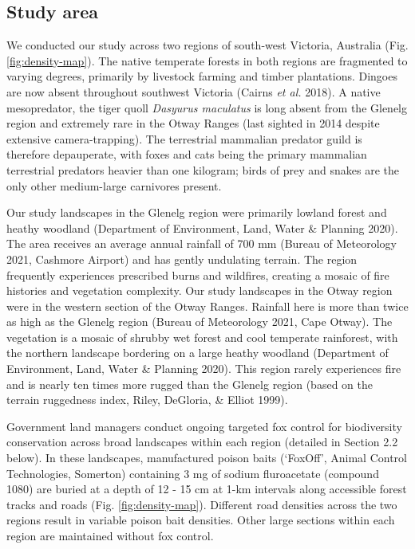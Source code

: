 \documentclass[preprint, 3p, authoryear]{elsarticle} %
\begin{document}
\hypertarget{study-area}{%
\subsection{Study area}\label{study-area}}

We conducted our study across two regions of south-west Victoria, Australia (Fig. \ref{fig:density-map}). The native temperate forests in both regions are fragmented to varying degrees, primarily by livestock farming and timber plantations. Dingoes are now absent throughout southwest Victoria (Cairns \emph{et al.} 2018). A native mesopredator, the tiger quoll \emph{Dasyurus maculatus} is long absent from the Glenelg region and extremely rare in the Otway Ranges (last sighted in 2014 despite extensive camera-trapping). The terrestrial mammalian predator guild is therefore depauperate, with foxes and cats being the primary mammalian terrestrial predators heavier than one kilogram; birds of prey and snakes are the only other medium-large carnivores present.

Our study landscapes in the Glenelg region were primarily lowland forest and heathy woodland (Department of Environment, Land, Water \& Planning 2020). The area receives an average annual rainfall of 700 mm (Bureau of Meteorology 2021, Cashmore Airport) and has gently undulating terrain. The region frequently experiences prescribed burns and wildfires, creating a mosaic of fire histories and vegetation complexity. Our study landscapes in the Otway region were in the western section of the Otway Ranges. Rainfall here is more than twice as high as the Glenelg region (Bureau of Meteorology 2021, Cape Otway). The vegetation is a mosaic of shrubby wet forest and cool temperate rainforest, with the northern landscape bordering on a large heathy woodland (Department of Environment, Land, Water \& Planning 2020). This region rarely experiences fire and is nearly ten times more rugged than the Glenelg region (based on the terrain ruggedness index, Riley, DeGloria, \& Elliot 1999).

Government land managers conduct ongoing targeted fox control for biodiversity conservation across broad landscapes within each region (detailed in Section 2.2 below). In these landscapes, manufactured poison baits (`FoxOff', Animal Control Technologies, Somerton) containing 3 mg of sodium fluroacetate (compound 1080) are buried at a depth of 12 - 15 cm at 1-km intervals along accessible forest tracks and roads (Fig. \ref{fig:density-map}). Different road densities across the two regions result in variable poison bait densities. Other large sections within each region are maintained without fox control.
\end{document}
